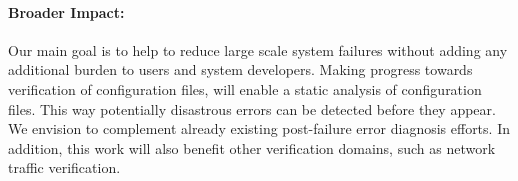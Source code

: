 \paragraph{Broader Impact:} 
Our main goal is to help to reduce large scale system failures without adding any additional burden to users and system developers. 
Making progress towards verification of configuration files, will enable a static analysis of configuration files. This way potentially disastrous errors can be 
detected before they appear.
We envision \app to complement already existing post-failure error diagnosis efforts.
In addition, this work will also benefit other verification domains, such as network traffic verification. 

